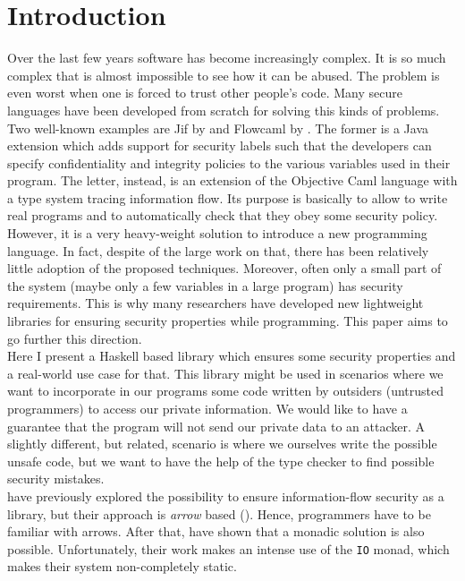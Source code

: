\section{Introduction}
Over the last few years software has become increasingly complex. It is so much complex that is almost impossible to see how it can be abused. The problem is even worst when one is forced to trust other people's code. Many secure languages have been developed from scratch for solving this kinds of problems. Two well-known examples are Jif \cite{pullicino2014jif} by \citeauthor{pullicino2014jif} and Flowcaml \cite{simonet2003flow} by \citeauthor{simonet2003flow}. The former is a Java extension which adds support for security labels such that the developers can specify confidentiality and integrity policies to the various variables used in their program. The letter, instead, is an extension of the Objective Caml language with a type system tracing information flow. Its purpose is basically to allow to write real programs and to automatically check that they obey some security policy. \\
However, it is a very heavy-weight solution to introduce a new programming language. In fact, despite of the large work on that, there has been relatively little adoption of the proposed techniques. Moreover, often only a small part of the system (maybe only a few variables in a large program) has security requirements. This is why many researchers have developed new lightweight libraries for ensuring security properties while programming. This paper aims to go further this direction. \\
Here I present a Haskell based library which ensures some security properties and a real-world use case for that. This library might be used in scenarios where we want to incorporate in our programs some code written by outsiders (untrusted programmers) to access our private information. We would like to have a guarantee that the program will not send our private data to an attacker. A slightly different, but related, scenario is where we ourselves write the possible unsafe code, but we want to have the help of the type checker to find possible security mistakes. \\
\citeauthor{li2006encoding} \cite{li2006encoding} have previously explored the possibility to ensure information-flow security as a library, but their approach is \textit{arrow} based (\cite{hughes2000generalising}). Hence, programmers have to be familiar with arrows. After that, \citeauthor{russo2008library} \cite{russo2008library} have shown that a monadic solution is also possible. Unfortunately, their work makes an intense use of the \texttt{IO} monad, which makes their system non-completely static. \\
